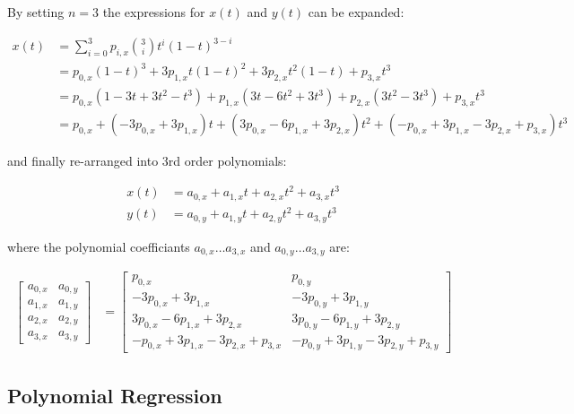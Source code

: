 By setting $n=3$ the expressions for $x(t)$ and $y(t)$ can be expanded:

\begin{align}
    x(t) &= \sum_{i=0}^3 p_{i,x} {3\choose i} t^i(1-t)^{3-i} \\
         &= p_{0,x}(1-t)^3 + 3p_{1,x}t(1-t)^2 + 3p_{2,x}t^2(1-t) + p_{3,x}t^3 \\
         &= p_{0,x}(1-3t+3t^2-t^3) + p_{1,x}(3t-6t^2+3t^3) + p_{2,x}(3t^2-3t^3) + p_{3,x}t^3 \\
         &= p_{0,x} + (-3p_{0,x} +3p_{1,x})t + (3p_{0,x} -6p_{1,x} +3p_{2,x})t^2 + (-p_{0,x}+3p_{1,x}-3p_{2,x}+p_{3,x})t^3
\end{align}

and finally re-arranged into 3rd order polynomials:

\begin{align}
    x(t) &= a_{0,x} + a_{1,x} t + a_{2,x} t^2 + a_{3,x} t^3 \label{eq:bezier_x} \\
    y(t) &= a_{0,y} + a_{1,y} t + a_{2,y} t^2 + a_{3,y} t^3 \label{eq:bezier_y}
\end{align}

where the polynomial coefficiants $a_{0,x} \ldots a_{3,x}$ and $a_{0,y} \ldots a_{3,y}$ are:

\begin{align}
    \begin{bmatrix}
        a_{0,x} & a_{0,y} \\
        a_{1,x} & a_{1,y} \\
        a_{2,x} & a_{2,y} \\
        a_{3,x} & a_{3,y}
    \end{bmatrix}
    &=
    \left[\begin{array}{ll}
        p_{0,x}                                   & p_{0,y} \\
        -3p_{0,x} + 3p_{1,x}                      & -3p_{0,y} + 3p_{1,y} \\
        3p_{0,x}  - 6p_{1,x} + 3p_{2,x}           & 3p_{0,y}  - 6p_{1,y} + 3p_{2,y} \\
        -p_{0,x}  + 3p_{1,x} - 3p_{2,x} + p_{3,x} & -p_{0,y}  + 3p_{1,y} - 3p_{2,y} + p_{3,y}
    \end{array}\right]
\end{align}

\subsection{Polynomial Regression}
\label{sec:polynomial-regression}

